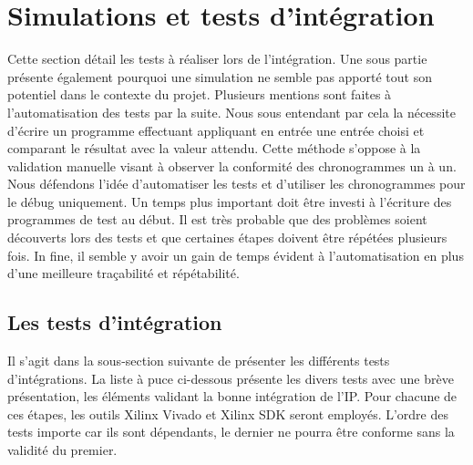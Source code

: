 \section{Simulations et tests d'intégration}
Cette section détail les tests à réaliser lors de l'intégration.
Une sous partie présente également pourquoi une simulation ne semble pas apporté tout son potentiel dans le contexte du projet.
Plusieurs mentions sont faites à l'automatisation des tests par la suite.
Nous sous entendant par cela la nécessite d'écrire un programme effectuant appliquant en entrée une entrée choisi et comparant le résultat avec la valeur attendu.
Cette méthode s'oppose à la validation manuelle visant à observer la conformité des chronogrammes un à un.
Nous défendons l'idée d'automatiser les tests et d'utiliser les chronogrammes pour le débug uniquement.
Un temps plus important doit être investi à l'écriture des programmes de test au début.
Il est très probable que des problèmes soient découverts lors des tests et que certaines étapes doivent être répétées plusieurs fois.
In fine, il semble y avoir un gain de temps évident à l'automatisation en plus d'une meilleure traçabilité et répétabilité.


\subsection{Les tests d'intégration}

Il s'agit dans la sous-section suivante de présenter les différents tests d'intégrations.
La liste à puce ci-dessous présente les divers tests avec une brève présentation, les éléments validant la bonne intégration de l'IP.
Pour chacune de ces étapes, les outils Xilinx Vivado et Xilinx SDK seront employés.
L'ordre des tests importe car ils sont dépendants, le dernier ne pourra être conforme sans la validité du premier.

